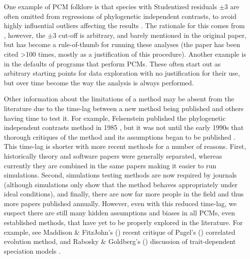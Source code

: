 \documentclass[a4paper,12pt]{article}
\begin{document}
    One example of PCM folklore is that species with Studentized residuals $\pm 3$ are often omitted from regressions of phylogenetic independent contrasts, to avoid highly influential outliers affecting the results \citep[e.g.][]{GEB:GEB355}. 
    The rationale for this comes from \citet{jones1997optimum}, however, the $\pm 3$ cut-off is arbitrary, and barely mentioned in the original paper, but has become a rule-of-thumb for running these analyses (the paper has been cited \textgreater 100 times, mostly as a justification of this procedure).
    Another example is in the defaults of programs that perform PCMs. 
    These often start out as arbitrary starting points for data exploration with no justification for their use, but over time become the way the analysis is always performed.

    Other information about the limitations of a method may be absent from the literature due to the time-lag between a new method being published and others having time to test it. 
    For example, Felsenstein published the phylogenetic independent contrasts method in 1985 \citep{felsenstein1985phylogenies}, but it was not until the early 1990s that thorough critiques of the method and its assumptions began to be published \citep[e.g.][]{garland1992procedures}.
    This time-lag is shorter with more recent methods for a number of reasons.
    First, historically theory and software papers were generally separated, whereas currently they are combined in the same papers making it easier to run simulations. 
    Second, simulations testing methods are now required by journals (although simulations only show that the method behaves appropriately under ideal conditions), and finally, there are now far more people in the field and thus more papers published annually.
    However, even with this reduced time-lag, we suspect there are still many hidden assumptions and biases in all PCMs, even established methods, that have yet to be properly explored in the literature.
    For example, see Maddison \& FitzJohn's (\citeyear{maddison2014unsolved}) recent critique of Pagel's (\citeyear{pagel1994detecting}) correlated evolution method, and Rabosky \& Goldberg's (\citeyear{rabosky2015model}) discussion of trait-dependent speciation models \citep{nee1994reconstructed,maddison2007estimating}.
\end{document}
